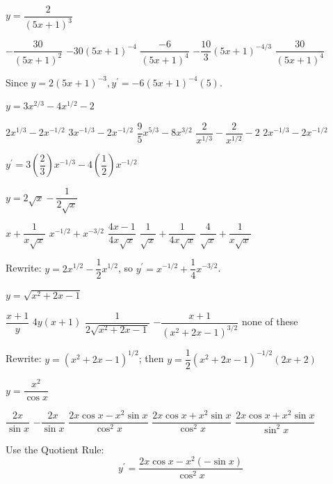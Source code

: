 \question
$y=\dfrac{2}{(5 x+1)^{3}}$
\begin{choices}
  \choice $-\dfrac{30}{(5 x+1)^{2}}$
  \CorrectChoice $-30(5 x+1)^{-4}$
  \choice $\dfrac{-6}{(5 x+1)^{4}}$
  \choice $-\dfrac{10}{3}(5 x+1)^{-4 / 3}$
  \choice $\dfrac{30}{(5 x+1)^{4}}$
\end{choices}
\begin{solution}
Since $y=2(5 x+1)^{-3}, y^{\prime}=-6(5 x+1)^{-4}(5)$.
\end{solution}

\question
$y=3 x^{2 / 3}-4 x^{1 / 2}-2$
\begin{choices}
  \choice $2 x^{1 / 3}-2 x^{-1 / 2}$
  \choice $3 x^{-1 / 3}-2 x^{-1 / 2}$
  \choice $\dfrac{9}{5} x^{5 / 3}-8 x^{3 / 2}$
  \choice $\dfrac{2}{x^{1 / 3}}-\dfrac{2}{x^{1 / 2}}-2$
  \CorrectChoice $2 x^{-1 / 3}-2 x^{-1 / 2}$
\end{choices}
\begin{solution}
$y^{\prime}=3\left(\dfrac{2}{3}\right) x^{-1 / 3}-4\left(\dfrac{1}{2}\right) x^{-1 / 2}$
\end{solution}


\newpage


\question
$y=2 \sqrt{x}-\dfrac{1}{2 \sqrt{x}}$
\begin{choices}
  \choice $x+\dfrac{1}{x \sqrt{x}}$
  \choice $x^{-1 / 2}+x^{-3 / 2}$
  \choice $\dfrac{4 x-1}{4 x \sqrt{x}}$
  \CorrectChoice $\dfrac{1}{\sqrt{x}}+\dfrac{1}{4 x \sqrt{x}}$
  \choice $\dfrac{4}{\sqrt{x}}+\dfrac{1}{x \sqrt{x}}$
\end{choices}
\begin{solution}
Rewrite: $y=2 x^{1 / 2}-\dfrac{1}{2} x^{1 / 2}$, so $y^{\prime}=x^{-1 / 2}+\dfrac{1}{4} x^{-3 / 2}$.
\end{solution}

\question
$y=\sqrt{x^{2}+2 x-1}$
\begin{choices}
  \CorrectChoice $\dfrac{x+1}{y}$
  \choice $4 y(x+1)$
  \choice $\dfrac{1}{2 \sqrt{x^{2}+2 x-1}}$
  \choice $-\dfrac{x+1}{\left(x^{2}+2 x-1\right)^{3 / 2}}$
  \choice none of these
\end{choices}
\begin{solution}
Rewrite: $y=\left(x^{2}+2 x-1\right)^{1 / 2}$; then $y=\dfrac{1}{2}\left(x^{2}+2 x-1\right)^{-1 / 2}(2 x+2)$
\end{solution}

\question
$y=\dfrac{x^{2}}{\cos x}$
\begin{choices}
  \choice $\dfrac{2 x}{\sin x}$
  \choice $-\dfrac{2 x}{\sin x}$
  \choice $\dfrac{2 x \cos x-x^{2} \sin x}{\cos ^{2} x}$
  \CorrectChoice $\dfrac{2 x \cos x+x^{2} \sin x}{\cos ^{2} x}$
  \choice $\dfrac{2 x \cos x+x^{2} \sin x}{\sin ^{2} x}$
\end{choices}
\begin{solution}
Use the Quotient Rule:
\[
y^{\prime}=\dfrac{2 x \cos x-x^{2}(-\sin x)}{\cos ^{2} x}
\]
\end{solution}


